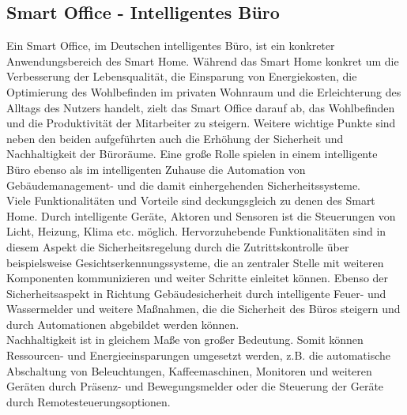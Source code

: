     \subsection{Smart Office - Intelligentes Büro}
    \label{subsec:smartoffice}
        Ein Smart Office, im Deutschen intelligentes Büro, ist ein konkreter Anwendungsbereich des Smart Home. 
        Während das Smart Home konkret um die Verbesserung der Lebensqualität, die Einsparung von Energiekosten,  
        die Optimierung des Wohlbefinden im privaten Wohnraum und die Erleichterung des Alltags des Nutzers handelt, 
        zielt das Smart Office darauf ab, das Wohlbefinden und die Produktivität der Mitarbeiter zu steigern. Weitere 
        wichtige Punkte sind neben den beiden aufgeführten auch die Erhöhung der Sicherheit und Nachhaltigkeit der 
        Büroräume. Eine große Rolle spielen in einem intelligente Büro ebenso als im intelligenten Zuhause die Automation 
        von Gebäudemanagement- und die damit einhergehenden Sicherheitssysteme. 
        \\
        \linebreak
        Viele Funktionalitäten und Vorteile sind deckungsgleich zu denen des Smart Home. Durch intelligente Geräte, Aktoren und 
        Sensoren ist die Steuerungen von Licht, Heizung, Klima etc. möglich. Hervorzuhebende Funktionalitäten sind in 
        diesem Aspekt die Sicherheitsregelung durch die Zutrittskontrolle über beispielsweise Gesichtserkennungssysteme, die 
        an zentraler Stelle mit weiteren Komponenten kommunizieren und weiter Schritte einleitet können. Ebenso der 
        Sicherheitsaspekt in Richtung Gebäudesicherheit durch intelligente Feuer- und Wassermelder und weitere Maßnahmen, die 
        die Sicherheit des Büros steigern und durch Automationen abgebildet werden können. 
        \\
        Nachhaltigkeit ist in gleichem Maße von großer Bedeutung. Somit können Ressourcen- und Energieeinsparungen umgesetzt 
        werden, z.B. die automatische Abschaltung von Beleuchtungen, Kaffeemaschinen, Monitoren und weiteren Geräten durch 
        Präsenz- und Bewegungsmelder oder die Steuerung der Geräte durch Remotesteuerungsoptionen.


